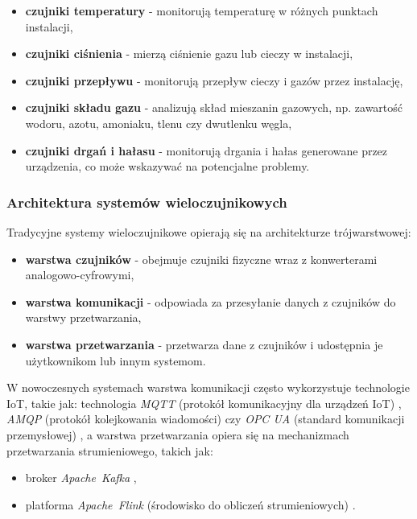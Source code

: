 \begin{itemize}
    \item \textbf{czujniki temperatury} - monitorują temperaturę w różnych punktach instalacji,
    \item \textbf{czujniki ciśnienia} - mierzą ciśnienie gazu lub cieczy w instalacji,
    \item \textbf{czujniki przepływu} - monitorują przepływ cieczy i gazów przez instalację,
    \item \textbf{czujniki składu gazu} - analizują skład mieszanin gazowych, np. zawartość wodoru, azotu, amoniaku, tlenu czy dwutlenku węgla,
    \item \textbf{czujniki drgań i hałasu} - monitorują drgania i hałas generowane przez urządzenia, co może wskazywać na potencjalne problemy.
\end{itemize}

\newpage

\subsubsection{Architektura systemów wieloczujnikowych}
\label{subsubsec:architektura_systemow}

Tradycyjne systemy wieloczujnikowe opierają się na architekturze trójwarstwowej:

\begin{itemize}
    \item \textbf{warstwa czujników} - obejmuje czujniki fizyczne wraz z konwerterami analogowo-cyfrowymi,
    \item \textbf{warstwa komunikacji} - odpowiada za przesyłanie danych z czujników do warstwy przetwarzania,
    \item \textbf{warstwa przetwarzania} - przetwarza dane z czujników i udostępnia je użytkownikom lub innym systemom.
\end{itemize}

\vspace{0.3em}

W nowoczesnych systemach warstwa komunikacji często wykorzystuje technologie IoT, takie jak: technologia \textit{MQTT} (protokół komunikacyjny dla urządzeń IoT) \cite{ietf_mqtt_v5}, \textit{AMQP} (protokół kolejkowania wiadomości) \cite{amqp_v1} czy \textit{OPC UA} (standard komunikacji przemysłowej) \cite{opc_ua_spec},
a warstwa przetwarzania opiera się na mechanizmach przetwarzania strumieniowego, takich jak:

\begin{itemize}
    \item broker \mbox{\textit{Apache Kafka}} \cite{kafka},
    \item platforma \mbox{\textit{Apache Flink}} (środowisko do obliczeń strumieniowych) \cite{flink}.
\end{itemize}


